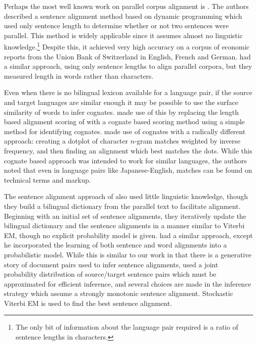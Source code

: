 Perhaps the most well known work on parallel corpus alignment is \citet{Gale91,Gale93}.
The authors described a sentence alignment method based on dynamic programming
which used only sentence length to determine whether or not two sentences were
parallel. This method is widely applicable since it assumes almost no linguistic
knowledge.\footnote{The only bit of information about the language pair required
is a ratio of sentence lengths in characters.} Despite this, it achieved very
high accuracy on a corpus of economic reports from the Union Bank of Switzerland
in English, French and German. \citet{Brown91} had a similar approach, using
only sentence lengths to align parallel corpora, but they measured length in
words rather than characters.

Even when there is no bilingual lexicon available for a language pair, if the
source and target languages are similar enough it may be possible to use the
surface similarity of words to infer cognates. \citet{Simard93} made use of this
by replacing the length based alignment scoring of \citet{Gale93} with a cognate
based scoring method using a simple method for identifying cognates.
\citet{Church93} made use of cognates with a radically different approach:
creating a dotplot of character $n$-gram matches weighted by inverse frequency,
and then finding an alignment which best matches the dots. While this cognate
based approach was intended to work for similar languages, the authors noted
that even in language pairs like Japanese-English, matches can be found on
technical terms and markup.

The sentence alignment approach of \citet{Kay93} also used little linguistic
knowledge, though they build a bilingual dictionary from the parallel text to
facilitate alignment. Beginning with an initial set of sentence alignments, they
iteratively update the bilingual dictionary and the sentence alignments in a
manner similar to Viterbi EM, though no explicit probability model is given.
\citet{Chen93} had a similar approach, except he
incorporated the learning of both sentence and word alignments into a
probabilistic model. While this is similar to our work in that there is a
generative story of document pairs used to infer sentence alignments,
\citet{Chen93} used a joint probability distribution of source/target sentence
pairs which must be approximated for efficient inference, and several choices
are made in the inference strategy which assume a strongly monotonic sentence
alignment. Stochastic Viterbi EM is used to find the best sentence alignment.

